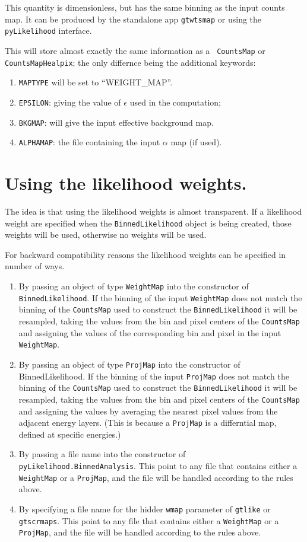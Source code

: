 \documentclass[preprint]{aastex}
\begin{document}
This quantity is dimensionless, but has the same binning as the input counts map.   
It can be produced by the standalone app {\tt gtwtsmap} or using the {\tt pyLikelihood} interface.

This will store almost exactly the same information as a {\tt
  CountsMap} or {\tt CountsMapHealpix}; the only differnce being the
additional keywords:
\begin{enumerate}
\item{{\tt MAPTYPE} will be set to ``WEIGHT_MAP''.}
\item{{\tt EPSILON}: giving the value of $\epsilon$ used in the computation;}
\item{{\tt BKGMAP}: will give the input effective background map.}    
\item{{\tt ALPHAMAP}: the file containing the input $\alpha$ map (if used).}
\end{enumerate}


\section{Using the likelihood weights.}

The idea is that using the likelihood weights is almost transparent.  If a likelihood
weight are specified when the {\tt BinnedLikelihood} object is being created, those weights
will be used, otherwise no weights will be used.

For backward compatibility reasons the likelihood weights can be specified in number of ways.

\begin{enumerate}
\item{By passing an object of type {\tt WeightMap} into the constructor of {\tt BinnedLikelihood}.
    If the binning of the input {\tt WeightMap} does not match the binning of the {\tt CountsMap}
    used to construct the {\tt BinnedLikelihood} it will be resampled, taking the values
    from the bin and pixel centers of the {\tt CountsMap} and assigning the values 
    of the corresponding bin and pixel in the input {\tt WeightMap}.}
\item{By passing an object of type {\tt ProjMap} into the constructor of BinnedLikelihood.
    If the binning of the input {\tt ProjMap} does not match the binning of the {\tt CountsMap}
    used to construct the {\tt BinnedLikelihood} it will be resampled, taking the values
    from the bin and pixel centers of the {\tt CountsMap} and assigning the values 
    by averaging the nearest pixel values from the adjacent energy layers.  
    (This is because a {\tt ProjMap} is a differntial map, defined at specific energies.)}
\item{By passing a file name into the constructor of {\tt pyLikelihood.BinnedAnalysis}.
    This point to any file that contains either a {\tt WeightMap} or a {\tt ProjMap}, and the
    file will be handled according to the rules above.}
\item{By specifying a file name for the hidder {\tt wmap} parameter of {\tt gtlike} or {\tt gtscrmaps}.
    This point to any file that contains either a {\tt WeightMap} or a {\tt ProjMap}, and the
    file will be handled according to the rules above.}
\end{enumerate}
\end{document}
